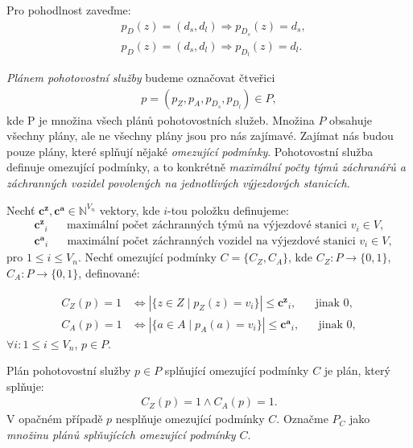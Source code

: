 Pro pohodlnost zaveďme:
\begin{align*}
  & p_D(z) = (d_s, d_l) \Rightarrow p_{D_s}(z) = d_s, \\
  & p_D(z) = (d_s, d_l) \Rightarrow p_{D_l}(z) = d_l.
\end{align*}

\textit{Plánem pohotovostní služby} budeme označovat 
čtveřici
\begin{align*}
  p = (p_Z, p_A, p_{D_{s}}, p_{D_{l}}) \in P,
\end{align*}
kde P je množina všech plánů pohotovostních služeb.
Množina $P$ obsahuje všechny plány, ale ne všechny plány jsou pro nás zajímavé.
Zajímat nás budou pouze plány, které splňují nějaké \textit{omezující podmínky}.
Pohotovostní služba definuje omezující podmínky, a to konkrétně \textit{maximální počty týmů záchranářů a záchranných vozidel povolených na jednotlivých výjezdových stanicích}.
\begin{definice}
  Nechť $\mathbf{c^z}, \mathbf{c^a} \in \mathbb{N}^{V_n}$ vektory, 
  kde $i$-tou položku definujeme:
  \begin{align*}
    &\mathbf{c^z}_i \hspace{20pt} \text{maximální počet záchranných týmů na výjezdové stanici $v_i \in V$}, \\ 
    &\mathbf{c^a}_i \hspace{20pt} \text{maximální počet záchranných vozidel na výjezdové stanici $v_i \in V$},
  \end{align*}
  pro $1 \leq i \leq V_n$.
  Nechť omezující podmínky $C = \{ C_Z, C_A \}$, kde $C_Z \colon P \rightarrow \{ 0, 1 \}$, $C_A \colon P \rightarrow \{ 0, 1 \}$, definované:

  \begin{align*}
    C_Z(p) = 1 &\iff |\{ z \in Z \mid p_Z(z) = v_i \}| \leq \mathbf{c^z}_i, \hspace{20pt} \text{jinak 0}, \\
    C_A(p) = 1 &\iff |\{ a \in A \mid p_A(a) = v_i \}| \leq \mathbf{c^a}_i, \hspace{20pt} \text{jinak 0},
  \end{align*}
  $\forall i \colon 1 \leq i \leq V_n$, $p \in P$.
\end{definice}

Plán pohotovostní služby $p \in P$ splňující omezující podmínky $C$ je plán, který splňuje:
\begin{align*}
    C_Z(p) = 1 \land C_A(p) = 1.
\end{align*}
V opačném případě $p$ nesplňuje omezující podmínky $C$.
Označme $P_C$ jako \textit{množinu plánů splňujících omezující podmínky $C$}.

